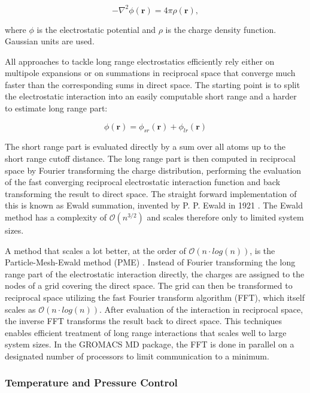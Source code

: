\documentclass[english, a4paper, 12pt, titlepage, draft]{article}
\newcommand{\vect}[1]{\mathbf{#1}}
\begin{document}
\begin{equation}
    -\nabla^2 \phi(\vect{r}) = 4 \pi \rho(\vect{r}),
\end{equation}

\noindent
where $\phi$ is the electrostatic potential and $\rho$ is the charge density function.
Gaussian units are used.

All approaches to tackle long range electrostatics efficiently rely either on multipole expansions or on summations in reciprocal space that converge much faster than the corresponding sums in direct space.
The starting point is to split the electrostatic interaction into an easily computable short range and a harder to estimate long range part:

\begin{equation}
    \phi(\vect{r}) = \phi_{sr}(\vect{r}) + \phi_{lr}(\vect{r})
\end{equation}

\noindent
The short range part is evaluated directly by a sum over all atoms up to the short range cutoff distance.
The long range part is then computed in reciprocal space by Fourier transforming the charge distribution, performing the evaluation of the fast converging reciprocal electrostatic interaction function and back transforming the result to direct space.
The straight forward implementation of this is known as Ewald summation, invented by P. P. Ewald in 1921 \cite{Ewald}.
The Ewald method has a complexity of $\mathcal{O}(n^{3/2})$ and scales therefore only to limited system sizes.

A method that scales a lot better, at the order of $\mathcal{O}(n \cdot log(n))$, is the Particle-Mesh-Ewald method (PME) \cite{PME}.
Instead of Fourier transforming the long range part of the electrostatic interaction directly, the charges are assigned to the nodes of a grid covering the direct space.
The grid can then be transformed to reciprocal space utilizing the fast Fourier transform algorithm (FFT), which itself scales as $\mathcal{O}(n \cdot log(n))$.
After evaluation of the interaction in reciprocal space, the inverse FFT transforms the result back to direct space.
This techniques enables efficient treatment of long range interactions that scales well to large system sizes.
In the GROMACS MD package, the FFT is done in parallel on a designated number of processors to limit communication to a minimum.




\subsubsection{Temperature and Pressure Control}
\label{sec:tempPressControl}
\end{document}
